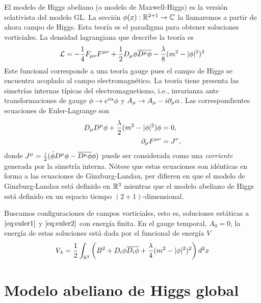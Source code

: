 El modelo de Higgs abeliano (o modelo de Maxwell-Higgs) es la versión relativista del modelo GL. La sección $\phi(x):\mathbb{R}^{2+1}\rightarrow\mathbb{C}$ la llamaremos a partir de ahora campo de Higgs. Esta teoría es el paradigma para obtener soluciones vorticiales. La densidad lagrangiana que describe la teoría es
\begin{align}
    \mathcal{L} = -\frac{1}{4} F_{\mu\nu}F^{\mu\nu}+\frac{1}{2}D_\mu\phi\overline{D^\mu\phi}-\frac{\lambda}{8}(m^2-|\phi|^2)^2 \label{eq:2}
\end{align}
Este funcional corresponde a una teoría gauge pues el campo de Higgs se encuentra acoplado al campo electromagnético. La teoría tiene presenta las simetrías internas típicas del electromagnetismo, i.e., invarianza ante transformaciones de gauge $\phi\rightarrow e^{i\alpha}\phi$ y $A_\mu\rightarrow A_\mu-i\partial_\mu\alpha$. Las correspondientes ecuaciones de Euler-Lagrange son
\begin{align}
    D_\mu D^\mu\phi + \frac{\lambda}{2}(m^2-|\phi|^2)\phi &=0,\label{eq:euler1}\\
    \partial_\mu F^{\mu\nu} &= J^\nu,\label{eq:euler2}
\end{align}
donde $J^\mu=\frac{i}{2}(\bar\phi D^\mu\phi-\overline{D^\mu\phi}\phi)$ puede ser considerada como una \emph{corriente} generada por la simetría interna.  Nótese que estas ecuaciones son idénticas en forma a las ecuaciones de Ginzburg-Landau, per difieren en que el modelo de Ginzburg-Landau está definido en $\mathbb{R}^3$ mientras que el modelo abeliano de Higgs está definido en un espacio tiempo $(2+1)$-dimensional.

Buscamos configuraciones de campos vorticiales, esto es, soluciones estáticas a $\eqref{eq:euler1}$ y $\eqref{eq:euler2}$ con energía finita. En el gauge temporal, $A_0=0$, la energía de estas soluciones está dada por el funcional de energía $V$
\begin{align}
    V_{\lambda} = \frac{1}{2}\int_{\mathbb{R}^2}\left(B^2+D_i\phi\overline{D_i\phi}+\frac{\lambda}{4}(m^2-|\phi|^2)^2\right)d^2x \label{eq:gl}
\end{align}

\newpage
\section{Modelo abeliano de Higgs global}
\label{sec:1.3}

